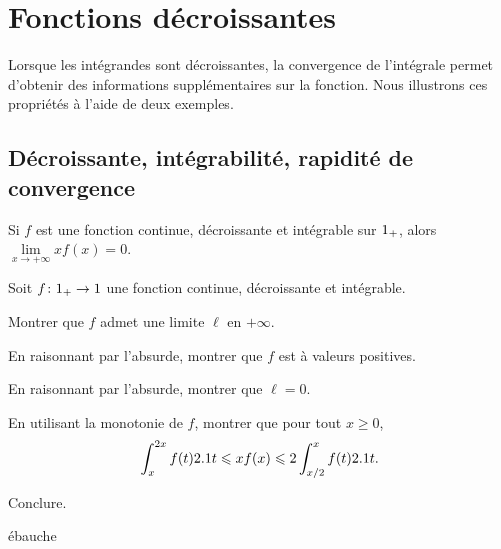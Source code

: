 \section{Fonctions décroissantes}


Lorsque les intégrandes sont décroissantes, la convergence de l'intégrale permet d'obtenir des informations supplémentaires sur la fonction. Nous illustrons ces propriétés à l'aide de deux exemples.

\subsection{Décroissante, intégrabilité, rapidité de convergence}\label{sec:decroissance}

\begin{prop}
Si $f$ est une fonction continue, décroissante et intégrable sur $\R_+$, alors $\lim\limits_{x\to+\infty} x f(x) = 0$.
\end{prop}

\begin{exercice}
Soit $\fonctionens[f]{\Rp}{\R}$ une fonction continue, décroissante et intégrable.
\begin{questions}
\item Montrer que $f$ admet une limite $\ell$ en $+\infty$.

\item En raisonnant par l'absurde, montrer que $f$ est à valeurs positives.

\item En raisonnant par l'absurde, montrer que $\ell = 0$.

\item En utilisant la monotonie de $f$, montrer que pour tout $x \geqslant 0$,
\[
\int_x^{2 x} f(t) \d t \leqslant x f(x) \leqslant 2 \int_{x/2}^x f(t) \d t.
\]

\item Conclure.
\end{questions}
\end{exercice}

\begin{marginfigure}[-2cm]
    \centering
    \caption{ébauche}
\end{marginfigure}

